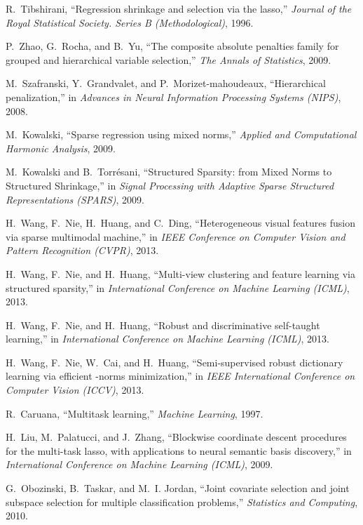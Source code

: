 \documentclass[9pt,technote,compsoc]{IEEEtran}
\begin{document}
\begin{thebibliography}{10}
	R.~Tibshirani, ``Regression shrinkage and selection via the lasso,''
	\emph{Journal of the Royal Statistical Society. Series B (Methodological)},
	1996.
	
	P.~Zhao, G.~Rocha, and B.~Yu, ``The composite absolute penalties family for
	grouped and hierarchical variable selection,'' \emph{The Annals of
		Statistics}, 2009.
	
	M.~Szafranski, Y.~Grandvalet, and P.~Morizet-mahoudeaux, ``Hierarchical
	penalization,'' in \emph{Advances in Neural Information Processing Systems
		(NIPS)}, 2008.
	
	M.~Kowalski, ``Sparse regression using mixed norms,'' \emph{Applied and
		Computational Harmonic Analysis}, 2009.
	
	M.~Kowalski and B.~Torr{\'e}sani, ``{Structured Sparsity: from Mixed Norms to
		Structured Shrinkage},'' in \emph{Signal Processing with Adaptive Sparse
		Structured Representations (SPARS)}, 2009.
	
	H.~Wang, F.~Nie, H.~Huang, and C.~Ding, ``Heterogeneous visual features fusion
	via sparse multimodal machine,'' in \emph{IEEE Conference on Computer Vision
		and Pattern Recognition (CVPR)}, 2013.
	
	H.~Wang, F.~Nie, and H.~Huang, ``Multi-view clustering and feature learning via
	structured sparsity,'' in \emph{International Conference on Machine Learning
		(ICML)}, 2013.
	
	H.~Wang, F.~Nie, and H.~Huang, ``Robust and discriminative self-taught
	learning,'' in \emph{International Conference on Machine Learning (ICML)},
	2013.
	
	H.~Wang, F.~Nie, W.~Cai, and H.~Huang, ``Semi-supervised robust dictionary
	learning via efficient -norms minimization,'' in \emph{IEEE
		International Conference on Computer Vision (ICCV)}, 2013.
	
	R.~Caruana, ``Multitask learning,'' \emph{Machine Learning}, 1997.
	
	H.~Liu, M.~Palatucci, and J.~Zhang, ``Blockwise coordinate descent procedures
	for the multi-task lasso, with applications to neural semantic basis
	discovery,'' in \emph{International Conference on Machine Learning (ICML)},
	2009.
	
	G.~Obozinski, B.~Taskar, and M.~I. Jordan, ``Joint covariate selection and
	joint subspace selection for multiple classification problems,''
	\emph{Statistics and Computing}, 2010.
	

\end{thebibliography}
\end{document}

